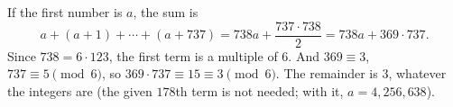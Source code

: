If the first number is $a$, the sum is
\[
a+(a+1)+\cdots+(a+737)=738a+\dfrac{737\cdot738}{2}=738a+369\cdot737 .
\]
Since $738=6\cdot123$, the first term is a multiple of $6$. And $369\equiv3$, $737\equiv5\pmod6$, so $369\cdot737\equiv15\equiv3\pmod6$. The remainder is $\boxed{3}$, whatever the integers are (the given $178$th term is not needed; with it, $a=4{,}256{,}638$).
